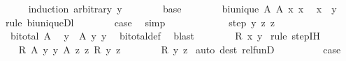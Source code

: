 \begin{isabellebody}
\ \ \ \ \isamarkupfalse%
{\isacharparenleft}{\kern0pt}induction\ arbitrary{\isacharcolon}{\kern0pt}\ y{\isacharparenright}{\kern0pt}\isanewline
\ \ \ \ \ \ \isamarkupfalse%
\ base\isanewline
\ \ \ \ \ \ \isamarkupfalse%
\ {\isacartoucheopen}bi{\isacharunderscore}{\kern0pt}unique\ A{\isacartoucheclose}\ {\isacartoucheopen}A\ x\ x{\isacharprime}{\kern0pt}{\isacartoucheclose}\ \isamarkupfalse%
\ {\isachardoublequoteopen}x\ {\isacharequal}{\kern0pt}\ y{\isachardoublequoteclose}\ \isamarkupfalse%
{\isacharparenleft}{\kern0pt}rule\ bi{\isacharunderscore}{\kern0pt}uniqueDl{\isacharparenright}{\kern0pt}\isanewline
\ \ \ \ \ \ \isamarkupfalse%
\ {\isacharquery}{\kern0pt}case\ \isamarkupfalse%
\ simp\isanewline
\ \ \ \ \isamarkupfalse%
\isanewline
\ \ \ \ \ \ \isamarkupfalse%
\ {\isacharparenleft}{\kern0pt}step\ y{\isacharprime}{\kern0pt}\ z{\isacharprime}{\kern0pt}\ z{\isacharparenright}{\kern0pt}\isanewline
\ \ \ \ \ \ \isamarkupfalse%
\ {\isacartoucheopen}bi{\isacharunderscore}{\kern0pt}total\ A{\isacartoucheclose}\ \isamarkupfalse%
\ y\ \ {\isachardoublequoteopen}A\ y\ y{\isacharprime}{\kern0pt}{\isachardoublequoteclose}\ \isamarkupfalse%
\ bi{\isacharunderscore}{\kern0pt}total{\isacharunderscore}{\kern0pt}def\ \isamarkupfalse%
\ blast\isanewline
\ \ \ \ \ \ \isamarkupfalse%
\ {\isachardoublequoteopen}R\isactrlsup {\isacharasterisk}{\kern0pt}\isactrlsup {\isacharasterisk}{\kern0pt}\ x\ y{\isachardoublequoteclose}\ \isamarkupfalse%
{\isacharparenleft}{\kern0pt}rule\ step{\isachardot}{\kern0pt}IH{\isacharparenright}{\kern0pt}\isanewline
\ \ \ \ \ \ \isamarkupfalse%
\ \isamarkupfalse%
\ R\ {\isacartoucheopen}A\ y\ y{\isacharprime}{\kern0pt}{\isacartoucheclose}\ {\isacartoucheopen}A\ z\ z{\isacharprime}{\kern0pt}{\isacartoucheclose}\ {\isacartoucheopen}R{\isacharprime}{\kern0pt}\ y{\isacharprime}{\kern0pt}\ z{\isacharprime}{\kern0pt}{\isacartoucheclose}\isanewline
\ \ \ \ \ \ \isamarkupfalse%
\ {\isachardoublequoteopen}R\ y\ z{\isachardoublequoteclose}\ \isamarkupfalse%
{\isacharparenleft}{\kern0pt}auto\ dest{\isacharcolon}{\kern0pt}\ rel{\isacharunderscore}{\kern0pt}funD{\isacharparenright}{\kern0pt}\isanewline
\ \ \ \ \ \ \isamarkupfalse%
\ \isamarkupfalse%
\ {\isacharquery}{\kern0pt}case\ \isacommand{{\isachardot}{\kern0pt}{\isachardot}{\kern0pt}}\isamarkupfalse%

\end{isabellebody}
